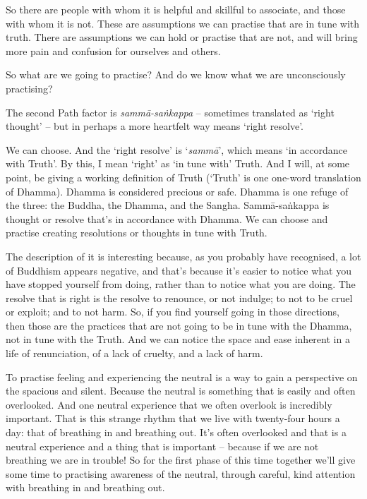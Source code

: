 So there are people with whom it is helpful and skillful to associate, and those
with whom it is not. These are assumptions we can practise that are in tune with
truth. There are assumptions we can hold or practise that are not, and will
bring more pain and confusion for ourselves and others.

So what are we going to practise? And do we know what we are unconsciously
practising?

The second Path factor is \emph{sammā-saṅkappa} -- sometimes translated as `right
thought' -- but in perhaps a more heartfelt way means `right resolve'.

We can choose. And the `right resolve' is `\emph{sammā}', which means `in
accordance with Truth'. By this, I mean `right' as `in tune with' Truth. And I
will, at some point, be giving a working definition of Truth (`Truth' is one
one-word translation of Dhamma). Dhamma is considered precious or
safe. Dhamma is one refuge of the three: the Buddha, the Dhamma,
and the Sangha. Sammā-saṅkappa is thought or resolve that's in accordance with
Dhamma. We can choose and practise creating resolutions or thoughts in tune with Truth.

The description of it is interesting because, as you probably have recognised, a
lot of Buddhism appears negative, and that's because it's easier to notice what
you have stopped yourself from doing, rather than to notice what you are doing. The
resolve that is right is the resolve to renounce, or not indulge; to not to be
cruel or exploit; and to not harm. So, if you find yourself going in those
directions, then those are the practices that are not going to be in tune with
the Dhamma, not in tune with the Truth. And we can notice the space and ease
inherent in a life of renunciation, of a lack of cruelty, and a lack of harm.

To practise feeling and experiencing the neutral is a way to gain a perspective on the spacious and silent. Because the neutral is
something that is easily and often overlooked. And one neutral experience that
we often overlook is incredibly important. That is this strange rhythm that we
live with twenty-four hours a day: that of breathing in and breathing out. It's
often overlooked and that is a neutral experience and a thing that is important --
because if we are not breathing we are in trouble! So for the first phase of
this time together we'll give some time to practising awareness of the neutral,
through careful, kind attention with breathing in and breathing out.

